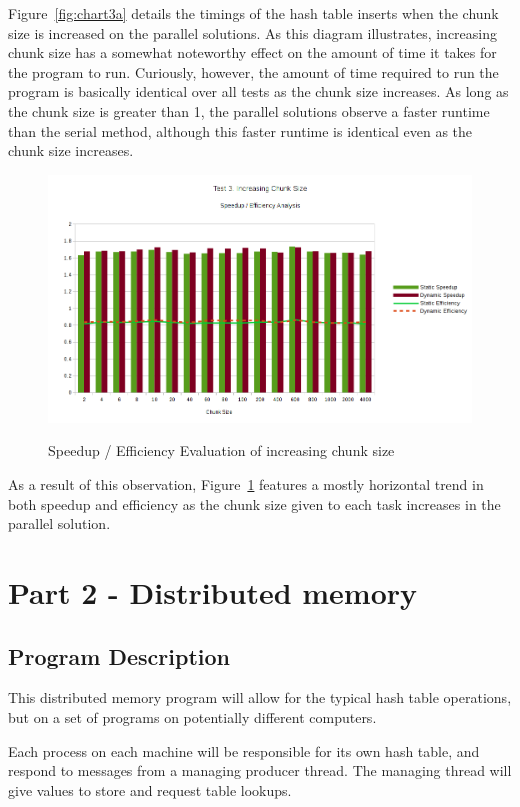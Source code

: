 \documentclass{article}
\begin{document}
Figure~\ref{fig:chart3a} details the timings of the hash table inserts when the chunk size is increased on the 
parallel solutions. As this diagram illustrates, increasing chunk size has a somewhat noteworthy effect on the 
amount of time it takes for the program to run. Curiously, however, the amount of time required to run the program 
is basically identical over all tests as the chunk size increases. As long as the chunk size is greater than 1, the 
parallel solutions observe a faster runtime than the serial method, although this faster runtime is identical even 
as the chunk size increases.

\begin{figure}[H]
  \caption{Speedup / Efficiency Evaluation of increasing chunk size}
  \centering
  \includegraphics[width=\textwidth]{chart3b}
    \label{fig:chart3b}
\end{figure}

As a result of this observation, Figure~\ref{fig:chart3b} features a mostly horizontal trend in both speedup and efficiency as the chunk size given to each task increases in the parallel solution. 

\section{Part 2 - Distributed memory}
\subsection{Program Description}
This distributed memory program will allow for the typical hash table operations, but on a set of programs on potentially different computers.

Each process on each machine will be responsible for its own hash table, and respond to messages from a managing producer thread. The managing thread will give values to store and request table lookups.
\end{document}
